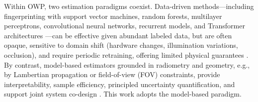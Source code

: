 \documentclass[journal]{IEEEtran}
\newcommand{\added}[1]{{\color{blue}#1}}
\begin{document}
\added{Within OWP, two estimation paradigms coexist. Data-driven methods---including fingerprinting with support vector machines, random forests, multilayer perceptrons, convolutional neural networks, recurrent models, and Transformer architectures \cite{Rekkas2023, Tran2022}---can be effective given abundant labeled data, but are often opaque, sensitive to domain shift (hardware changes, illumination variations, occlusion), and require periodic retraining, offering limited physical guarantees \cite{Glass2021}. By contrast, model-based estimators grounded in radiometry and geometry, e.g., by Lambertian propagation or field-of-view (FOV) constraints, provide interpretability, sample efficiency, principled uncertainty quantification, and support joint system co-design \cite{Deng2023}. This work adopts the model-based paradigm.}
\end{document}
